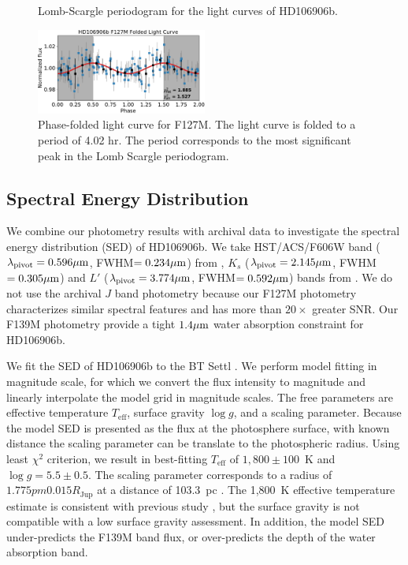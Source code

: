 \documentclass[modern]{aastex62}
\begin{document}
\begin{figure}
  \centering
  \caption{Lomb-Scargle periodogram for the light curves of HD106906b.}
  \label{fig:periodogram}
\end{figure}

\begin{figure}
  \centering
  \includegraphics[width=0.5\textwidth]{figures/F127M_foldedLC.pdf}
  \caption{Phase-folded light curve for F127M. The light curve is folded to a period of 4.02 hr. The period corresponds to the most significant peak in the Lomb Scargle periodogram.}
  \label{fig:fold}
\end{figure}

\subsection{Spectral Energy Distribution}
We combine our photometry results with archival data to investigate the spectral energy distribution (SED) of HD106906b.  We take HST/ACS/F606W band ($\lambda_{\mathrm{pivot}}=0.596\mbox{$\mu$m}$, FWHM$=0.234\mbox{$\mu$m}$) from \citet{Kalas2015}, $K_{s}$ ($\lambda_{\mathrm{pivot}}=2.145\mbox{$\mu$m}$, FWHM$=0.305\mbox{$\mu$m}$) and $L'$ ($\lambda_{\mathrm{pivot}}=3.774\mbox{$\mu$m}$, FWHM$=0.592\mbox{$\mu$m}$) bands from \citet{Bailey2013}. We do not use the archival $J$ band photometry because our F127M photometry characterizes similar spectral features and has more than $20\times$ greater SNR. Our F139M photometry provide a tight $1.4\mbox{$\mu$m}$ water absorption constraint for HD106906b.

We fit the SED of HD106906b to the BT Settl \citep[][Figure~\ref{fig:SED}]{Allard2012}. We perform model fitting in magnitude scale, for which we convert the flux intensity to magnitude and linearly interpolate the model grid in magnitude scales. The free parameters are effective temperature $T_{\mathrm{eff}}$, surface gravity $\log g$, and a scaling parameter. Because the model SED is presented as the flux at the photosphere surface, with known distance the scaling parameter can be translate to the photospheric radius. Using least $\chi^{2}$ criterion, we result in best-fitting $T_{\mathrm{eff}}$ of $1,800\pm100$~K and $\log g=5.5\pm0.5$.  The scaling parameter corresponds to a radius of  $1.775pm0.015R_{\mathrm{Jup}}$ at a distance of 103.3~pc \citep{Gaia2018,Gaia2016}. The 1,800~K effective temperature estimate is consistent with previous study \citep{Bailey2013,Wu2016}, but the surface gravity is not compatible with a low surface gravity assessment. In addition, the model SED under-predicts the F139M band flux, or over-predicts the depth of the water absorption band.
\end{document}
